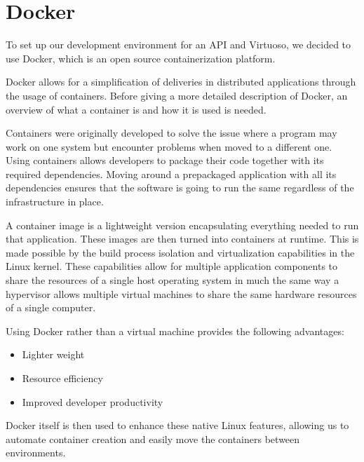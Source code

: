 \section{Docker}
To set up our development environment for an API and Virtuoso, we decided to use Docker, which is an open source containerization platform.

Docker allows for a simplification of deliveries in distributed applications through the usage of containers\cite{Container_Docker}. 
Before giving a more detailed description of Docker, an overview of what a container is and how it is used is needed. 


Containers were originally developed to solve the issue where a program may work on one system but encounter problems when moved to a different one. 
Using containers allows developers to package their code together with its required dependencies. 
Moving around a prepackaged application with all its dependencies ensures that the software is going to run the same regardless of the infrastructure in place\cite{Container_Docker}.


A container image is a lightweight version encapsulating everything needed to run that application. These images are then turned into containers at runtime. 
This is made possible by the build process isolation and virtualization capabilities in the Linux kernel. 
These capabilities allow for multiple application components to share the resources of a single host operating system in much the same way a hypervisor allows multiple virtual machines to share the same hardware resources of a single computer\cite{Container_Docker}.


Using Docker rather than a virtual machine provides the following advantages:

\begin{itemize}
    \item Lighter weight
    \item Resource efficiency
    \item Improved developer productivity
\end{itemize}

Docker itself is then used to enhance these native Linux features, allowing us to automate container creation and easily move the containers between environments\cite{Docker_IBM}.